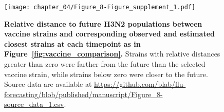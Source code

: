 \begin{figure}
  \texttt{[image: chapter\_04/Figure\_8-Figure\_supplement\_1.pdf]}
  \caption[{Relative distance to future H3N2 populations between vaccine strains and corresponding observed and estimated closest strains at each timepoint as in Figure~\ref{fig:vaccine_comparison}.}]{
    {\bf Relative distance to future H3N2 populations between vaccine strains and corresponding observed and estimated closest strains at each timepoint as in Figure~\ref{fig:vaccine_comparison}.}
    Strains with relative distances greater than zero were farther from the future than the selected vaccine strain, while strains below zero were closer to the future.
    Source data are available at \url{https://github.com/blab/flu-forecasting/blob/published/manuscript/Figure_8-source_data_1.csv}.
  }
  \label{fig:vaccine_comparison_relative_distance}
\end{figure}

